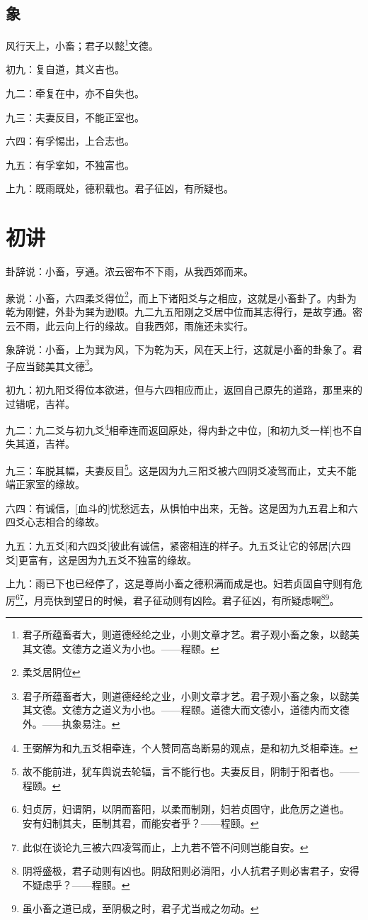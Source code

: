 \documentclass[12pt,oneside]{book}
\begin{document}
\subsection{象}
风行天上，小畜；君子以懿\footnote{君子所蕴畜者大，则道德经纶之业，小则文章才艺。君子观小畜之象，以懿美其文德。文德方之道义为小也。——程颐。}文德。

初九：复自道，其义吉也。

九二：牵复在中，亦不自失也。

九三：夫妻反目，不能正室也。

六四：有孚惕出，上合志也。

九五：有孚挛如，不独富也。

上九：既雨既处，德积载也。君子征凶，有所疑也。


\section{初讲}
卦辞说：小畜，亨通。浓云密布不下雨，从我西郊而来。

彖说：小畜，六四柔爻得位\footnote{柔爻居阴位}，而上下诸阳爻与之相应，这就是小畜卦了。内卦为乾为刚健，外卦为巽为逊顺。九二九五阳刚之爻居中位而其志得行，是故亨通。密云不雨，此云向上行的缘故。自我西郊，雨施还未实行。

象辞说：小畜，上为巽为风，下为乾为天，风在天上行，这就是小畜的卦象了。君子应当懿美其文德\footnote{君子所蕴畜者大，则道德经纶之业，小则文章才艺。君子观小畜之象，以懿美其文德。文德方之道义为小也。——程颐。道德大而文德小，道德内而文德外。——执象易注。}。

初九：初九阳爻得位本欲进，但与六四相应而止，返回自己原先的道路，那里来的过错呢，吉祥。

九二：九二爻与初九爻\footnote{王弼解为和九五爻相牵连，个人赞同高岛断易的观点，是和初九爻相牵连。}相牵连而返回原处，得内卦之中位，[和初九爻一样]也不自失其道，吉祥。

九三：车脱其幅，夫妻反目\footnote{故不能前进，犹车舆说去轮辐，言不能行也。夫妻反目，阴制于阳者也。——程颐。}。这是因为九三阳爻被六四阴爻凌驾而止，丈夫不能端正家室的缘故。

六四：有诚信，[血斗的]忧愁远去，从惧怕中出来，无咎。这是因为九五君上和六四爻心志相合的缘故。

九五：九五爻[和六四爻]彼此有诚信，紧密相连的样子。九五爻让它的邻居[六四爻]更富有，这是因为九五爻不独富的缘故。

上九：雨已下也已经停了，这是尊尚小畜之德积满而成是也。妇若贞固自守则有危厉\footnote{ 妇贞厉，妇谓阴，以阴而畜阳，以柔而制刚，妇若贞固守，此危厉之道也。 安有妇制其夫，臣制其君，而能安者乎？——程颐。}\footnote{此似在谈论九三被六四凌驾而止，上九若不管不问则岂能自安。}，月亮快到望日的时候，君子征动则有凶险。君子征凶，有所疑虑啊\footnote{阴将盛极，君子动则有凶也。阴敌阳则必消阳，小人抗君子则必害君子，安得不疑虑乎？——程颐。}\footnote{虽小畜之道已成，至阴极之时，君子尤当戒之勿动。}。
\end{document}
